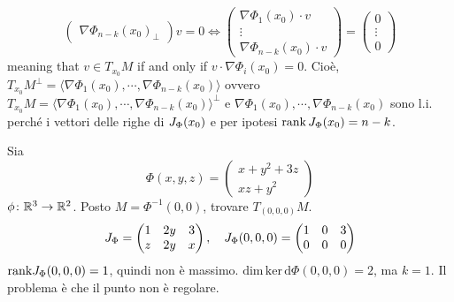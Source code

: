 \documentclass[a4paper]{article}
\begin{document}
\begin{snippetexample}{}
\[\begin{pmatrix}
            \nabla \Phi_{n-k}(x_0)_\perp
        \end{pmatrix} v = 0 \iff
        \begin{pmatrix}
            \nabla \Phi_1(x_0) \cdot v \\
            \vdots \\
            \nabla \Phi_{n-k}(x_0) \cdot v
        \end{pmatrix} = \begin{pmatrix}
            0 \\ \vdots \\ 0
        \end{pmatrix}
    \]
    meaning that \(v\in T_{x_0}M\) if and only if \(v \cdot \nabla \Phi_i(x_0) = 0\).
    Cioè, \(T_{x_0}M^\perp = \langle \nabla \Phi_1(x_0), \cdots, \nabla \Phi_{n-k}(x_0)\rangle\)
    ovvero \(T_{x_0}M = \langle \nabla \Phi_1(x_0), \cdots, \nabla \Phi_{n-k}(x_0) \rangle^\perp\)
    e \(\nabla \Phi_1(x_0), \cdots, \nabla \Phi_{n-k}(x_0)\) sono l.i. perché i vettori
    delle righe di \(J_\Phi(x_0)\) e per ipotesi \(\text{rank}\,J_\Phi(x_0) = n-k\).
\end{snippetexample}

\begin{snippetexample}{}
    Sia
    \[
        \Phi(x,y,z) = \begin{pmatrix}
            x + y^2 + 3z \\ xz + y^2
        \end{pmatrix}
    \]
    \(\phi \colon \mathbb{R}^3 \to \mathbb{R}^2\).
    Posto \(M = \Phi^{-1}(0,0)\), trovare \(T_{(0,0,0)}M\).
    \[
        J_\Phi = \begin{pmatrix}
            1 & 2y & 3 \\ z & 2y & x
        \end{pmatrix}, \quad J_\Phi(0,0,0) = \begin{pmatrix}
            1 & 0 & 3 \\ 0 & 0 & 0
        \end{pmatrix}
    \]
    \(\text{rank} J_\Phi(0,0,0) = 1\), quindi non è massimo.
    \(\text{dim}\,\text{ker}\,\text{d}\Phi(0,0,0) =2\), ma \(k=1\).
    Il problema è che il punto non è regolare.
\end{snippetexample}
\end{document}
